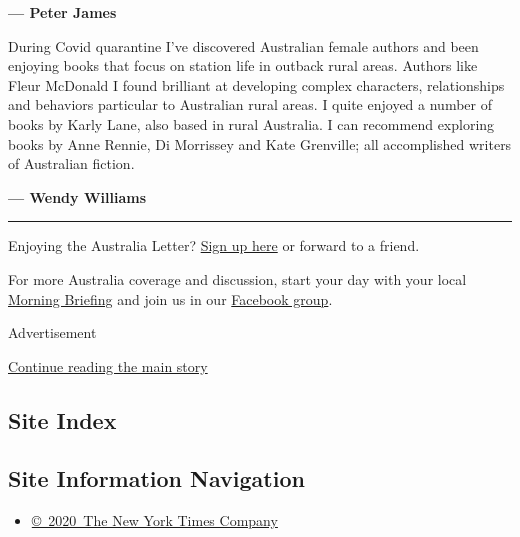 \textbf{--- Peter James}

During Covid quarantine I've discovered Australian female authors and
been enjoying books that focus on station life in outback rural areas.
Authors like Fleur McDonald I found brilliant at developing complex
characters, relationships and behaviors particular to Australian rural
areas. I quite enjoyed a number of books by Karly Lane, also based in
rural Australia. I can recommend exploring books by Anne Rennie, Di
Morrissey and Kate Grenville; all accomplished writers of Australian
fiction.

\textbf{--- Wendy Williams}

\begin{center}\rule{0.5\linewidth}{\linethickness}\end{center}

Enjoying the Australia Letter?
\href{https://www.nytimes3xbfgragh.onion/newsletters/australia-letter?module=inline}{Sign
up here} or forward to a friend.

For more Australia coverage and discussion, start your day with your
local
\href{https://www.nytimes3xbfgragh.onion/interactive/2018/briefing/global-morning-briefing-newsletter-signup.html?utm_source=ausend}{Morning
Briefing} and join us in our
\href{https://www.facebookcorewwwi.onion/groups/nytaustralia/}{Facebook
group}.

Advertisement

\protect\hyperlink{after-bottom}{Continue reading the main story}

\hypertarget{site-index}{%
\subsection{Site Index}\label{site-index}}

\hypertarget{site-information-navigation}{%
\subsection{Site Information
Navigation}\label{site-information-navigation}}

\begin{itemize}
\tightlist
\item
  \href{https://help.nytimes3xbfgragh.onion/hc/en-us/articles/115014792127-Copyright-notice}{©~2020~The
  New York Times Company}
\end{itemize}

